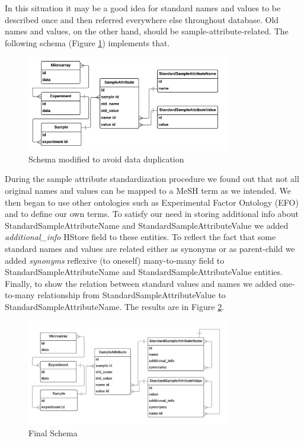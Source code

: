 \documentclass[conference]{IEEEtran}
\begin{document}
In this situation it may be a good idea for standard names and values to be described once and then referred everywhere else throughout database. Old names and values, on the other hand, should be sample-attribute-related. The following schema (Figure \ref{fig:AvoidDuplicationSchema}) implements that.

\begin{figure}[h]
        \includegraphics[width=3.5in]{plots/AvoidDuplicationSchema}
        \caption{Schema modified to avoid data duplication}
        \label{fig:AvoidDuplicationSchema}
\end{figure}

During the sample attribute standardization procedure we found out that not all original names and values can be mapped to a MeSH term as we intended. We then began to use other ontologies such as Experimental Factor Ontology (EFO) and to define our own terms. To satisfy our need in storing additional info about StandardSampleAttributeName and StandardSampleAttributeValue we added \textit{additional\_info} HStore field to these entities. To reflect the fact that some standard names and values are related either as synonyms or as parent-child we added \textit{synonyms} reflexive (to oneself) many-to-many field to StandardSampleAttributeName and StandardSampleAttributeValue entities. Finally, to show the relation between standard values and names we added one-to-many relationship from StandardSampleAttributeValue to StandardSampleAttributeName. The results are in Figure \ref{fig:FinalSchema}.

\begin{figure}[h]
        \includegraphics[width=3.5in]{plots/Schema}
        \caption{Final Schema}
        \label{fig:FinalSchema}
\end{figure}
\end{document}
